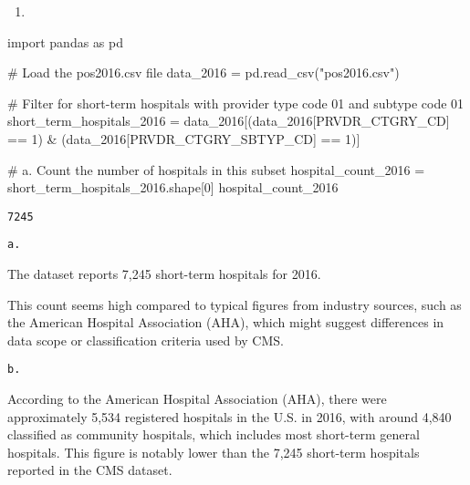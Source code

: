 \documentclass[
  letterpaper,
  DIV=11,
  numbers=noendperiod]{scrartcl}
\newenvironment{Shaded}{\begin{snugshade}}{\end{snugshade}}
\newcommand{\CommentTok}[1]{\textcolor[rgb]{0.37,0.37,0.37}{#1}}
\newcommand{\DecValTok}[1]{\textcolor[rgb]{0.68,0.00,0.00}{#1}}
\newcommand{\ImportTok}[1]{\textcolor[rgb]{0.00,0.46,0.62}{#1}}
\newcommand{\NormalTok}[1]{\textcolor[rgb]{0.00,0.23,0.31}{#1}}
\newcommand{\OperatorTok}[1]{\textcolor[rgb]{0.37,0.37,0.37}{#1}}
\newcommand{\StringTok}[1]{\textcolor[rgb]{0.13,0.47,0.30}{#1}}
\providecommand{\tightlist}{%
  \setlength{\itemsep}{0pt}\setlength{\parskip}{0pt}}\usepackage{longtable,booktabs,array}
\begin{document}
\begin{enumerate}
\def\labelenumi{\arabic{enumi}.}
\setcounter{enumi}{1}
\tightlist
\item
\end{enumerate}

\begin{Shaded}
\begin{Highlighting}[]
\ImportTok{import}\NormalTok{ pandas }\ImportTok{as}\NormalTok{ pd}

\CommentTok{\# Load the pos2016.csv file}
\NormalTok{data\_2016 }\OperatorTok{=}\NormalTok{ pd.read\_csv(}\StringTok{"pos2016.csv"}\NormalTok{)}

\CommentTok{\# Filter for short{-}term hospitals with provider type code 01 and subtype code 01}
\NormalTok{short\_term\_hospitals\_2016 }\OperatorTok{=}\NormalTok{ data\_2016[(data\_2016[}\StringTok{\textquotesingle{}PRVDR\_CTGRY\_CD\textquotesingle{}}\NormalTok{] }\OperatorTok{==} \DecValTok{1}\NormalTok{) }\OperatorTok{\&}\NormalTok{ (data\_2016[}\StringTok{\textquotesingle{}PRVDR\_CTGRY\_SBTYP\_CD\textquotesingle{}}\NormalTok{] }\OperatorTok{==} \DecValTok{1}\NormalTok{)]}

\CommentTok{\# a. Count the number of hospitals in this subset}
\NormalTok{hospital\_count\_2016 }\OperatorTok{=}\NormalTok{ short\_term\_hospitals\_2016.shape[}\DecValTok{0}\NormalTok{]}
\NormalTok{hospital\_count\_2016}
\end{Highlighting}
\end{Shaded}

\begin{verbatim}
7245
\end{verbatim}

\begin{verbatim}
a.
\end{verbatim}

The dataset reports 7,245 short-term hospitals for 2016.

This count seems high compared to typical figures from industry sources,
such as the American Hospital Association (AHA), which might suggest
differences in data scope or classification criteria used by CMS.

\begin{verbatim}
b.
\end{verbatim}

According to the American Hospital Association (AHA), there were
approximately 5,534 registered hospitals in the U.S. in 2016, with
around 4,840 classified as community hospitals, which includes most
short-term general hospitals. This figure is notably lower than the
7,245 short-term hospitals reported in the CMS dataset.
\end{document}
